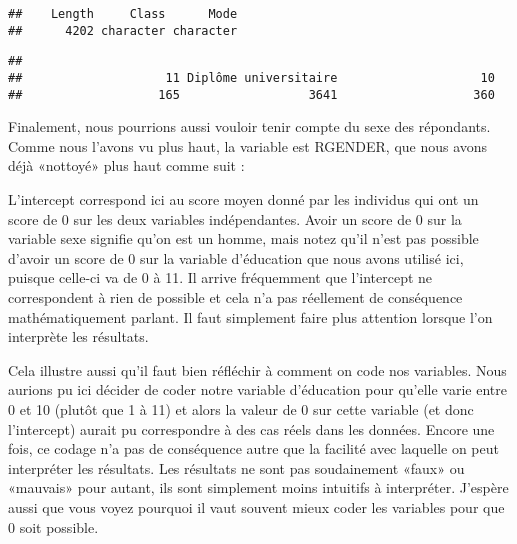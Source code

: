 \documentclass[
]{book}
\newenvironment{Shaded}{\begin{snugshade}}{\end{snugshade}}
\newcommand{\CommentTok}[1]{\textcolor[rgb]{0.56,0.35,0.01}{\textit{#1}}}
\newcommand{\DecValTok}[1]{\textcolor[rgb]{0.00,0.00,0.81}{#1}}
\newcommand{\FunctionTok}[1]{\textcolor[rgb]{0.00,0.00,0.00}{#1}}
\newcommand{\NormalTok}[1]{#1}
\newcommand{\OtherTok}[1]{\textcolor[rgb]{0.56,0.35,0.01}{#1}}
\newcommand{\SpecialCharTok}[1]{\textcolor[rgb]{0.00,0.00,0.00}{#1}}
\begin{document}
\begin{verbatim}
##    Length     Class      Mode 
##      4202 character character
\end{verbatim}

\begin{Shaded}
\end{Shaded}

\begin{verbatim}
## 
##                    11 Diplôme universitaire                    10 
##                   165                  3641                   360
\end{verbatim}

Finalement, nous pourrions aussi vouloir tenir compte du sexe des répondants. Comme nous l'avons vu plus haut, la variable est RGENDER, que nous avons déjà «nottoyé» plus haut comme suit :

L'intercept correspond ici au score moyen donné par les individus qui ont un score de 0 sur les deux variables indépendantes. Avoir un score de 0 sur la variable sexe signifie qu'on est un homme, mais notez qu'il n'est pas possible d'avoir un score de 0 sur la variable d'éducation que nous avons utilisé ici, puisque celle-ci va de 0 à 11. Il arrive fréquemment que l'intercept ne correspondent à rien de possible et cela n'a pas réellement de conséquence mathématiquement parlant. Il faut simplement faire plus attention lorsque l'on interprète les résultats.

Cela illustre aussi qu'il faut bien réfléchir à comment on code nos variables. Nous aurions pu ici décider de coder notre variable d'éducation pour qu'elle varie entre 0 et 10 (plutôt que 1 à 11) et alors la valeur de 0 sur cette variable (et donc l'intercept) aurait pu correspondre à des cas réels dans les données. Encore une fois, ce codage n'a pas de conséquence autre que la facilité avec laquelle on peut interpréter les résultats. Les résultats ne sont pas soudainement «faux» ou «mauvais» pour autant, ils sont simplement moins intuitifs à interpréter. J'espère aussi que vous voyez pourquoi il vaut souvent mieux coder les variables pour que 0 soit possible.
\end{document}
